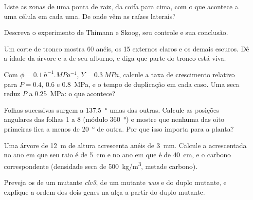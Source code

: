 \begin{exercise}[$\star$]\label{exo:b2:plant-meristems:2}
Liste as zonas de uma ponta de raiz, da coifa para cima, com o que
acontece a uma célula em cada uma. De onde vêm as raízes laterais?
\end{exercise}

\begin{exercise}[$\star$]\label{exo:b2:plant-meristems:3}
Descreva o experimento de Thimann e Skoog, seu controle e sua
conclusão.
\end{exercise}

\begin{exercise}[$\star$]\label{exo:b2:plant-meristems:4}
Um corte de tronco mostra 60 anéis, os 15 externos claros e os demais
escuros. Dê a idade da árvore e a de seu alburno, e diga que parte do
tronco está viva.
\end{exercise}

\begin{exercise}[$\star\star$]\label{exo:b2:plant-meristems:5}
Com $\phi = \qty{0.1}{h^{-1}.MPa^{-1}}$, $Y = \qty{0.3}{MPa}$, calcule
a taxa de crescimento relativo para $P = 0.4$, $0.6$ e \qty{0.8}{MPa},
e o tempo de duplicação em cada caso. Uma seca reduz $P$ a
\qty{0.25}{MPa}: o que acontece?
\end{exercise}

\begin{exercise}[$\star\star$]\label{exo:b2:plant-meristems:6}
Folhas sucessivas surgem a \qty{137.5}{\degree} umas das outras.
Calcule as posições angulares das folhas 1 a 8 (módulo
\qty{360}{\degree}) e mostre que nenhuma das oito primeiras fica a
menos de \qty{20}{\degree} de outra. Por que isso importa para a
planta?
\end{exercise}

\begin{exercise}[$\star\star$]\label{exo:b2:plant-meristems:7}
Uma árvore de \qty{12}{m} de altura acrescenta anéis de \qty{3}{mm}.
Calcule a  acrescentada no ano em que seu raio é de
\qty{5}{cm} e no ano em que é de \qty{40}{cm}, e o carbono
correspondente (densidade seca de \qty{500}{kg/m^3}, metade carbono).
\end{exercise}

\begin{exercise}[$\star\star$]\label{exo:b2:plant-meristems:8}
Preveja os  de um mutante \emph{clv3}, de um mutante
\emph{wus} e do duplo mutante, e explique a ordem dos dois genes na
alça a partir do duplo mutante.
\end{exercise}

